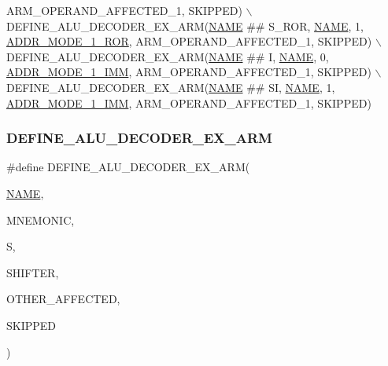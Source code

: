 \begin{DoxyCode}
      ARM\_OPERAND\_AFFECTED\_1, SKIPPED) \(\backslash\)
    DEFINE\_ALU\_DECODER\_EX\_ARM(\mbox{\hyperlink{inflate_8h_a164ea0159d5f0b5f12a646f25f99eceaa67bc2ced260a8e43805d2480a785d312}{NAME}} ## S\_ROR, \mbox{\hyperlink{inflate_8h_a164ea0159d5f0b5f12a646f25f99eceaa67bc2ced260a8e43805d2480a785d312}{NAME}}, 1, \mbox{\hyperlink{decoder-arm_8c_a52afd307d8b50469ab0811de861100c7}{ADDR\_MODE\_1\_ROR}}, 
      ARM\_OPERAND\_AFFECTED\_1, SKIPPED) \(\backslash\)
    DEFINE\_ALU\_DECODER\_EX\_ARM(\mbox{\hyperlink{inflate_8h_a164ea0159d5f0b5f12a646f25f99eceaa67bc2ced260a8e43805d2480a785d312}{NAME}} ## I, \mbox{\hyperlink{inflate_8h_a164ea0159d5f0b5f12a646f25f99eceaa67bc2ced260a8e43805d2480a785d312}{NAME}}, 0, \mbox{\hyperlink{decoder-arm_8c_a2a4a6ca79222326b9ebf7aa606a84c64}{ADDR\_MODE\_1\_IMM}}, 
      ARM\_OPERAND\_AFFECTED\_1, SKIPPED) \(\backslash\)
    DEFINE\_ALU\_DECODER\_EX\_ARM(\mbox{\hyperlink{inflate_8h_a164ea0159d5f0b5f12a646f25f99eceaa67bc2ced260a8e43805d2480a785d312}{NAME}} ## SI, \mbox{\hyperlink{inflate_8h_a164ea0159d5f0b5f12a646f25f99eceaa67bc2ced260a8e43805d2480a785d312}{NAME}}, 1, \mbox{\hyperlink{decoder-arm_8c_a2a4a6ca79222326b9ebf7aa606a84c64}{ADDR\_MODE\_1\_IMM}}, 
      ARM\_OPERAND\_AFFECTED\_1, SKIPPED)
\end{DoxyCode}
\mbox{\label{decoder-arm_8c_a9f65c06daece247752b5fd0285e475f3}} 
\subsubsection{\texorpdfstring{D\+E\+F\+I\+N\+E\+\_\+\+A\+L\+U\+\_\+\+D\+E\+C\+O\+D\+E\+R\+\_\+\+E\+X\+\_\+\+A\+RM}{DEFINE\_ALU\_DECODER\_EX\_ARM}}
{\footnotesize\ttfamily \#define D\+E\+F\+I\+N\+E\+\_\+\+A\+L\+U\+\_\+\+D\+E\+C\+O\+D\+E\+R\+\_\+\+E\+X\+\_\+\+A\+RM(\begin{DoxyParamCaption}\item[{}]{\mbox{\hyperlink{inflate_8h_a164ea0159d5f0b5f12a646f25f99eceaa67bc2ced260a8e43805d2480a785d312}{N\+A\+ME}},  }\item[{}]{M\+N\+E\+M\+O\+N\+IC,  }\item[{}]{S,  }\item[{}]{S\+H\+I\+F\+T\+ER,  }\item[{}]{O\+T\+H\+E\+R\+\_\+\+A\+F\+F\+E\+C\+T\+ED,  }\item[{}]{S\+K\+I\+P\+P\+ED }\end{DoxyParamCaption})}

